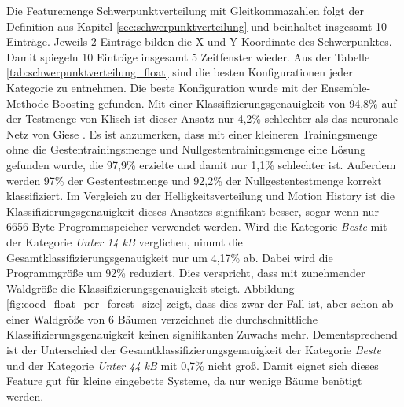 Die Featuremenge Schwerpunktverteilung mit Gleitkommazahlen folgt der Definition aus Kapitel \ref{sec:schwerpunktverteilung} und beinhaltet insgesamt 10 Einträge. Jeweils 2 Einträge bilden die X und Y
Koordinate des Schwerpunktes. Damit spiegeln 10 Einträge insgesamt 5 Zeitfenster wieder.
\newline
\newline
Aus der Tabelle \ref{tab:schwerpunktverteilung_float} sind die besten Konfigurationen jeder Kategorie zu entnehmen. Die beste Konfiguration wurde mit der Ensemble-Methode Boosting gefunden.
Mit einer Klassifizierungsgenauigkeit von 94,8\% auf der Testmenge von Klisch ist dieser Ansatz nur 4,2\% schlechter als das neuronale Netz von Giese \cite{gieseThesis}. Es ist anzumerken, dass mit einer
kleineren Trainingsmenge ohne die Gestentrainingsmenge und Nullgestentrainingsmenge eine Lösung gefunden wurde, die 97,9\% erzielte und damit nur 1,1\% schlechter ist.
Außerdem werden 97\% der Gestentestmenge und 92,2\% der Nullgestentestmenge korrekt klassifiziert.
\newline
\newline
Im Vergleich zu der Helligkeitsverteilung und Motion History ist die Klassifizierungsgenauigkeit dieses Ansatzes signifikant besser, sogar wenn nur 6656 Byte Programmspeicher verwendet werden.
Wird die Kategorie \textit{Beste} mit der Kategorie \textit{Unter 14 kB} verglichen, nimmt die Gesamtklassifizierungsgenauigkeit nur um 4,17\% ab. Dabei wird die Programmgröße um 92\% reduziert.
Dies verspricht, dass mit zunehmender Waldgröße die Klassifizierungsgenauigkeit steigt. Abbildung \ref{fig:cocd_float_per_forest_size} zeigt, dass dies zwar der Fall ist, aber schon ab einer Waldgröße von 6
Bäumen verzeichnet die durchschnittliche Klassifizierungsgenauigkeit keinen signifikanten Zuwachs mehr. Dementsprechend ist der Unterschied der Gesamtklassifizierungsgenauigkeit der Kategorie \textit{Beste}
und der Kategorie \textit{Unter 44 kB} mit 0,7\% nicht groß. Damit eignet sich dieses Feature gut für kleine eingebette Systeme, da nur wenige Bäume benötigt werden.